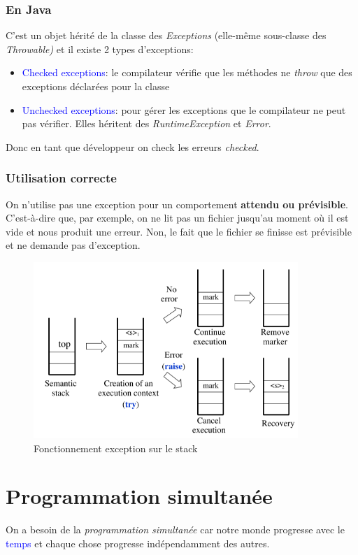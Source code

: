 \documentclass{report}
\begin{document}
\subsection{En Java}
C'est un objet hérité de la classe des \textit{Exceptions} (elle-même sous-classe des \textit{Throwable)} et il existe 2 types d'exceptions:
\begin{itemize}
\item \textcolor{blue}{Checked exceptions}: le compilateur vérifie que les méthodes ne \textit{throw} que des exceptions déclarées pour la classe
\item \textcolor{blue}{Unchecked exceptions}: pour gérer les exceptions que le compilateur ne peut pas vérifier. Elles héritent des \textit{RuntimeException} et \textit{Error}.
\end{itemize}
Donc en tant que développeur on check les erreurs \textit{checked}.

\subsection{Utilisation correcte}
On n'utilise pas une exception pour un comportement \textbf{attendu ou prévisible}. C'est-à-dire que, par exemple, on ne lit pas un fichier jusqu'au moment où il est vide et nous produit une erreur. Non, le fait que le fichier se finisse est prévisible et ne demande pas d'exception.
\begin{figure}[H]
\centering
\includegraphics[width=10cm]{img/stackException.png}
\caption{Fonctionnement exception sur le stack}
\end{figure}

\chapter{Programmation simultanée}
On a besoin de la \textit{programmation simultanée} car notre monde progresse avec le \textcolor{blue}{temps} et chaque chose progresse indépendamment des autres.
\end{document}
